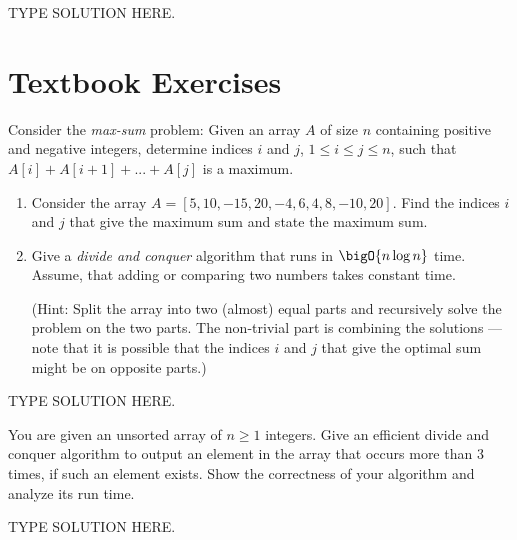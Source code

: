 \documentclass[final]{article}
\begin{document}
\begin{solution}
    TYPE SOLUTION HERE.
\end{solution}

\section{Textbook Exercises}
\begin{exercise}{5.18}
    Consider the \emph{max-sum} problem: Given an array $A$ of size $n$ containing positive and negative integers, determine indices $i$ and $j$, $1 \leq i \leq j \leq n$, such that $A[i] + A[i+1] + ... + A[j]$ is a maximum.
    \begin{enumerate}[label=(\alph*)]
        \item Consider the array $A = [5, 10, -15, 20, -4, 6, 4, 8, -10, 20]$. Find the indices $i$ and $j$ that give the maximum sum and state the maximum sum.
        \item Give a \emph{divide and conquer} algorithm that runs in  $\bigO{n\log{n}}$ time. Assume, that adding or comparing two numbers takes constant time.

              (Hint: Split the array into two (almost) equal parts and recursively solve the problem on the two parts. The non-trivial part is combining the solutions --- note that it is possible that the indices $i$ and $j$ that give the optimal sum might be on opposite parts.)
    \end{enumerate}
\end{exercise}

\begin{solution}
    TYPE SOLUTION HERE.
\end{solution}

\begin{exercise}{5.23}
    You are given an unsorted array of $n \geq 1$ integers. Give an efficient divide and conquer algorithm to output an element in the array that occurs more than 3 times, if such an element exists.  Show the correctness of your algorithm and analyze its run time.
\end{exercise}

\begin{solution}
    TYPE SOLUTION HERE.
\end{solution}
\end{document}
